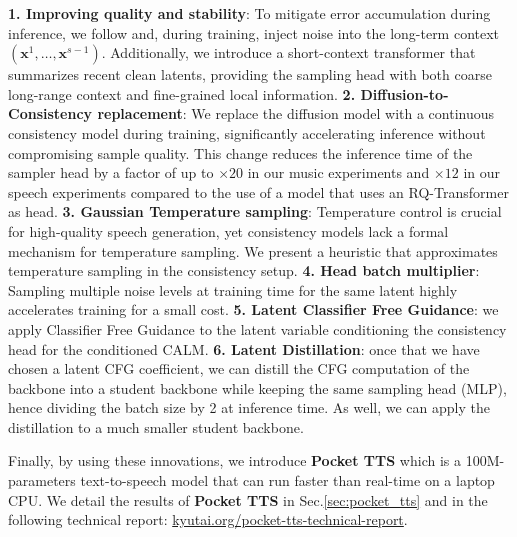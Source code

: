 \textbf{1. Improving quality and stability}: To mitigate error accumulation during inference, we follow \cite{sony_trick} and, during training, inject noise into the long-term context $(\mathbf{x}^1, \ldots, \mathbf{x}^{s-1})$. Additionally, we introduce a short-context transformer that summarizes recent clean latents, providing the sampling head with both coarse long-range context and fine-grained local information. \textbf{2. Diffusion-to-Consistency replacement}: We replace the diffusion model with a continuous consistency model \citep{continuous_consistency} during training, significantly accelerating inference without compromising sample quality. This change reduces the inference time of the sampler head by a factor of up to $\times 20$ in our music experiments and $\times 12$ in our speech experiments compared to the use of a model that uses an RQ-Transformer as head. \textbf{3. Gaussian Temperature sampling}: Temperature control is crucial for high-quality speech generation, yet consistency models lack a formal mechanism for temperature sampling. We present a heuristic that approximates temperature sampling in the consistency setup. \textbf{4. Head batch multiplier}: Sampling multiple noise levels at training time for the same latent highly accelerates training for a small cost.  \textbf{5. Latent Classifier Free Guidance}: we apply Classifier Free Guidance to the latent variable conditioning the consistency head for the conditioned CALM. \textbf{6. Latent Distillation}: once that we have chosen a latent CFG coefficient, we can distill the CFG computation of the backbone into a student backbone while keeping the same sampling head (MLP), hence dividing the batch size by 2 at inference time. As well, we can apply the distillation to a much smaller student backbone. 

Finally, by using these innovations, we introduce \textbf{Pocket TTS} which is a 100M-parameters text-to-speech model that can run faster than real-time on a laptop CPU. We detail the results of \textbf{Pocket TTS} in Sec.\ref{sec:pocket_tts} and in the following technical report: \href{https://kyutai.org/pocket-tts-technical-report}{kyutai.org/pocket-tts-technical-report}.



